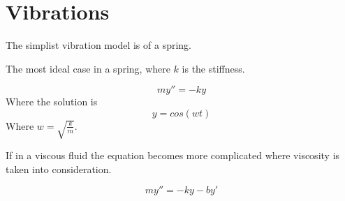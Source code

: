 \section{Vibrations}

The simplist vibration model is of a spring.

The most ideal case in a spring, where $k$ is the stiffness.

\begin{equation*}
    my''=-ky
\end{equation*}
Where the solution is
\begin{equation*}
    y=cos(wt)
\end{equation*}
Where $w = \sqrt{\frac km}$.


If in a viscous fluid the equation becomes more complicated where viscosity is taken into consideration.

\begin{equation*}
    my''=-ky-by'
\end{equation*}
